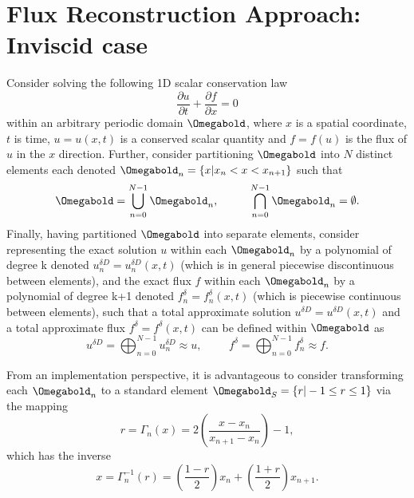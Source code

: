 \section{Flux Reconstruction Approach: Inviscid case}

\noindent Consider solving the following 1D scalar conservation law
\begin{equation}
\frac{\partial u}{\partial t}+\frac{\partial f}{\partial x}=0
\label{governing}
\end{equation}
within an arbitrary periodic domain $\Omegabold$, where $x$ is a spatial coordinate, $t$ is time, $u=u(x,t)$ is a conserved scalar quantity and $f=f(u)$ is the flux of $u$ in the $x$ direction. Further, consider partitioning $\Omegabold$ into $N$ distinct elements each denoted $\Omegabold_n=\{x|x_n<x<x_{n+1}\}$ such that
\begin{equation}
\Omegabold=\bigcup_{n=0}^{N-1}\Omegabold_n,\hspace{1cm}\bigcap_{n=0}^{N-1}\Omegabold_n=\emptyset.
\end{equation}
Finally, having partitioned $\Omegabold$ into separate elements, consider representing the exact solution $u$ within each $\Omegabold_n$ by a polynomial of degree k denoted $u^{\delta D}_n=u^{\delta D}_n(x,t)$ (which is in general piecewise discontinuous between elements), and the exact flux $f$ within each $\Omegabold_n$ by a polynomial of degree k+1 denoted $f^{\delta}_n=f^{\delta}_n(x,t)$ (which is piecewise continuous between elements), such that a total approximate solution $u^{\delta D}=u^{\delta D}(x,t)$ and a total approximate flux $f^{\delta}=f^{\delta}(x,t)$ can be defined within $\Omegabold$ as
\begin{equation}
u^{\delta D}=\bigoplus_{n=0}^{N-1}u_n^{\delta D}\approx u,\hspace{1cm}f^{\delta}=\bigoplus_{n=0}^{N-1}f_n^{\delta}\approx f. 
\end{equation}

\vspace{0.1 in}
\noindent From an implementation perspective, it is advantageous to consider transforming each $\Omegabold_n$ to a standard element $\Omegabold_S=\{r|-1\leq r\leq 1\}$ via the mapping
\begin{equation}
r=\Gamma_n(x)=2\left(\frac{x-x_n}{x_{n+1}-x_n}\right)-1,
\end{equation}
which has the inverse
\begin{equation}
x=\Gamma_n^{-1}(r)=\left(\frac{1-r}{2}\right)x_n+\left(\frac{1+r}{2}\right)x_{n+1}. 
\end{equation}


